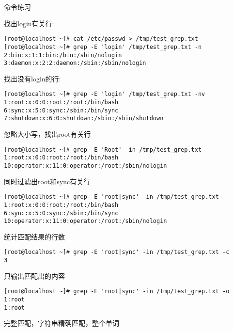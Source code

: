 \begin{ascolorbox10}{命令练习}
	\begin{ascboxJ}{找出login有关行:}
		\begin{lstlisting}[style=linux]
[root@localhost ~]# cat /etc/passwd > /tmp/test_grep.txt
[root@localhost ~]# grep -E 'login' /tmp/test_grep.txt -n
2:bin:x:1:1:bin:/bin:/sbin/nologin
3:daemon:x:2:2:daemon:/sbin:/sbin/nologin
		\end{lstlisting}
	\end{ascboxJ}
	\begin{ascboxJ}{找出没有login的行:}
	\begin{lstlisting}[style=linux]
[root@localhost ~]# grep -E 'login' /tmp/test_grep.txt -nv
1:root:x:0:0:root:/root:/bin/bash
6:sync:x:5:0:sync:/sbin:/bin/sync
7:shutdown:x:6:0:shutdown:/sbin:/sbin/shutdown
	\end{lstlisting}
\end{ascboxJ}
	\begin{ascboxJ}{忽略大小写，找出root有关行}
	\begin{lstlisting}[style=linux]
[root@localhost ~]# grep -E 'Root' -in /tmp/test_grep.txt
1:root:x:0:0:root:/root:/bin/bash
10:operator:x:11:0:operator:/root:/sbin/nologin
	\end{lstlisting}
\end{ascboxJ}
	\begin{ascboxJ}{同时过滤出root和sync有关行}
	\begin{lstlisting}[style=linux]
[root@localhost ~]# grep -E 'root|sync' -in /tmp/test_grep.txt
1:root:x:0:0:root:/root:/bin/bash
6:sync:x:5:0:sync:/sbin:/bin/sync
10:operator:x:11:0:operator:/root:/sbin/nologin
	\end{lstlisting}
\end{ascboxJ}
	\begin{ascboxJ}{统计匹配结果的行数}
	\begin{lstlisting}[style=linux]
[root@localhost ~]# grep -E 'root|sync' -in /tmp/test_grep.txt -c
3
	\end{lstlisting}
\end{ascboxJ}
	\begin{ascboxJ}{只输出匹配出的内容}
	\begin{lstlisting}[style=linux]
[root@localhost ~]# grep -E 'root|sync' -in /tmp/test_grep.txt -o
1:root
1:root
	\end{lstlisting}
\end{ascboxJ}
	\begin{ascboxJ}{完整匹配，字符串精确匹配，整个单词}
	\begin{lstlisting}[style=linux]

\end{lstlisting}
\end{ascboxJ}
\end{ascolorbox10}
